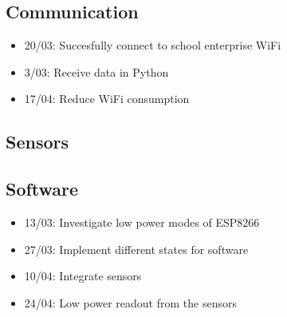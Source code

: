\documentclass[]{article}
\begin{document}
	\subsection{Communication}
	\begin{itemize}
		\item 20/03: Succesfully connect to school enterprise WiFi
		\item 3/03: Receive data in Python
		\item 17/04: Reduce WiFi consumption
	\end{itemize}

	\subsection{Sensors}
	
	\subsection{Software}
	\begin{itemize}
		\item 13/03: Investigate low power modes of ESP8266
		\item 27/03: Implement different states for software
		\item 10/04: Integrate sensors
		\item 24/04: Low power readout from the sensors
	\end{itemize}
\end{document}
